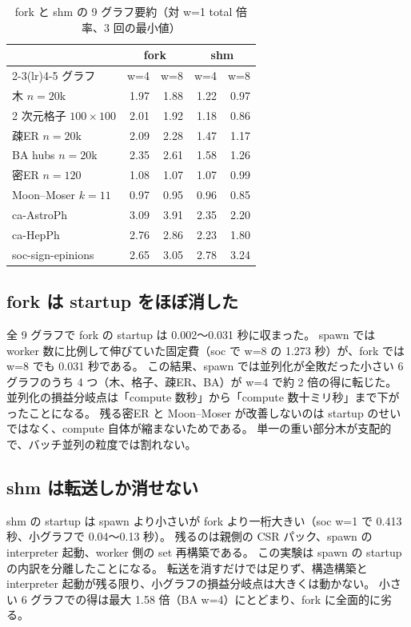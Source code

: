 \begin{table}[htbp]
  \centering
  \caption{fork と shm の 9 グラフ要約（対 w=1 total 倍率、3 回の最小値）}
  \label{tab:shm-summary}
  \begin{tabular}{lrrrr}
    \toprule
    & \multicolumn{2}{c}{fork} & \multicolumn{2}{c}{shm} \\
    \cmidrule(lr){2-3}\cmidrule(lr){4-5}
    グラフ & w=4 & w=8 & w=4 & w=8 \\
    \midrule
    木 $n{=}20$k          & 1.97 & 1.88 & 1.22 & 0.97 \\
    2 次元格子 $100\times100$ & 2.01 & 1.92 & 1.18 & 0.86 \\
    疎ER $n{=}20$k        & 2.09 & 2.28 & 1.47 & 1.17 \\
    BA hubs $n{=}20$k     & 2.35 & 2.61 & 1.58 & 1.26 \\
    密ER $n{=}120$        & 1.08 & 1.07 & 1.07 & 0.99 \\
    Moon–Moser $k{=}11$   & 0.97 & 0.95 & 0.96 & 0.85 \\
    ca-AstroPh            & 3.09 & 3.91 & 2.35 & 2.20 \\
    ca-HepPh              & 2.76 & 2.86 & 2.23 & 1.80 \\
    soc-sign-epinions     & 2.65 & 3.05 & 2.78 & 3.24 \\
    \bottomrule
  \end{tabular}
\end{table}

\subsection{fork は startup をほぼ消した}

全 9 グラフで fork の startup は 0.002〜0.031 秒に収まった。
spawn では worker 数に比例して伸びていた固定費（soc で w=8 の 1.273 秒）が、fork では w=8 でも 0.031 秒である。
この結果、spawn では並列化が全敗だった小さい 6 グラフのうち 4 つ（木、格子、疎ER、BA）が w=4 で約 2 倍の得に転じた。
並列化の損益分岐点は「compute 数秒」から「compute 数十ミリ秒」まで下がったことになる。
残る密ER と Moon–Moser が改善しないのは startup のせいではなく、compute 自体が縮まないためである。
単一の重い部分木が支配的で、バッチ並列の粒度では割れない。

\subsection{shm は転送しか消せない}

shm の startup は spawn より小さいが fork より一桁大きい（soc w=1 で 0.413 秒、小グラフで 0.04〜0.13 秒）。
残るのは親側の CSR パック、spawn の interpreter 起動、worker 側の set 再構築である。
この実験は spawn の startup の内訳を分離したことになる。
転送を消すだけでは足りず、構造構築と interpreter 起動が残る限り、小グラフの損益分岐点は大きくは動かない。
小さい 6 グラフでの得は最大 1.58 倍（BA w=4）にとどまり、fork に全面的に劣る。

